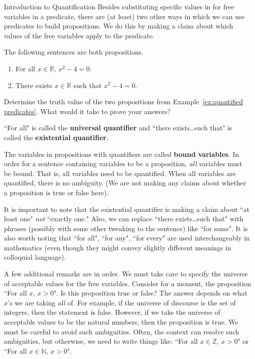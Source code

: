 \begin{section}{Introduction to Quantification}
Besides substituting specific values in for free variables in a predicate, there are (at least) two other ways in which we can use predicates to build propositions.  We do this by making a claim about which values of the free variables apply to the predicate.

\begin{example}\label{ex:quantified predicates}
The following sentences are both propositions.
\begin{enumerate}
\item For all $x\in\mathbb{R}$, $x^2-4=0$.
\item There exists $x\in\mathbb{R}$ such that $x^2-4=0$.
\end{enumerate}
\end{example}

\begin{exercise}
Determine the truth value of the two propositions from Example~\ref{ex:quantified predicates}.  What would it take to prove your answers?
\end{exercise}

\begin{definition}
``For all" is called the \textbf{universal quantifier} and ``there exists\ldots such that" is called the \textbf{existential quantifier}.
\end{definition}

The variables in propositions with quantifiers are called \textbf{bound variables}.  In order for a sentence containing variables to be a proposition, \emph{all} variables must be bound.  That is, all variables need to be quantified.  When all variables are quantified, there is no ambiguity.  (We are not making any claims about whether a proposition is true or false here).

It is important to note that the existential quantifier is making a claim about ``at least one" \emph{not} ``exactly one."    Also, we can replace ``there exists\ldots such that" with phrases (possibly with some other tweaking to the sentence) like ``for some".  It is also worth noting that ``for all", ``for any", ``for every" are used interchangeably in mathematics (even though they might convey slightly different meanings in colloquial language).  

A few additional remarks are in order.  We must take care to specify the universe of acceptable values for the free variables.  Consider for a moment, the proposition ``For all $x$, $x>0$".  Is this proposition true or false?  The answer depends on what $x$'s we are taking \emph{all} of.  For example, if the universe of discourse is the set of integers, then the statement is false.  However, if we take the universe of acceptable values to be the natural numbers, then the proposition is true.  We must be careful to avoid such ambiguities.  Often, the context can resolve such ambiguities, but otherwise, we need to write things like: ``For all $x\in\mathbb{Z}$, $x>0$" or ``For all $x\in\mathbb{N}$, $x>0$".


\end{section}
